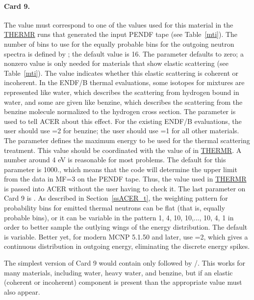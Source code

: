 \paragraph{Card 9.}
The value  must correspond to one of the values used for
this material in the \hyperlink{sTHERMRhy}{THERMR} runs that
generated the input PENDF tape
(see Table~\ref{mti}).  The number of bins to use for the equally
probable bins for the outgoing neutron spectra is defined by
; the default value is 16.  The parameter 
defaults to zero; a nonzero value is only needed for materials that
show elastic scattering (see Table~\ref{mti}).  The value 
indicates whether this elastic scattering is coherent or incoherent.
In the ENDF/B thermal evaluations, some isotopes for mixtures are
represented like water, which describes the scattering from hydrogen
bound in water, and some are given like benzine, which describes the
scattering from the benzine molecule normalized to the hydrogen cross
section.  The parameter  is used to tell ACER about this
effect.  For the existing ENDF/B evaluations, the user should use
=2 for benzine; the user should use =1
for all other materials.  The parameter  defines the
maximum energy to be used for the thermal scattering treatment.  This
value should be coordinated with the value of  in
\hyperlink{sTHERMRhy}{THERMR}.  A number
around 4 eV is reasonable for most problems.  The default
for this parameter is 1000., which means that the code will determine
the upper limit from the data in MF=3 on the PENDF tape.  Thus, the
value used in \hyperlink{sTHERMRhy}{THERMR} is passed
into ACER without the user having to
check it.  The last parameter on Card 9 is .  As described
in Section~\ref{ssACER_t}, the weighting pattern for probability bins for
emitted thermal neutrons can be flat (that is, equally probable bins),
or it can be variable in the pattern 1, 4, 10, 10,..., 10, 4, 1 in
order to better sample the outlying wings of the energy distribution.
The default is variable.  Better yet, for modern MCNP 5.1.50 and later,
use =2, which gives a continuous distribution in outgoing
energy, eliminating the discrete energy spikes.

The simplest version of Card 9 would contain only  followed
by /.  This works for many materials, including water, heavy water,
and benzine, but if an elastic (coherent or incoherent) component is
present than the appropriate  value must also appear.

